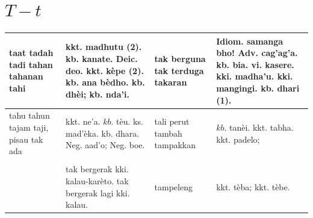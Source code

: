 \documentclass[10pt]{article}
\begin{document}
\section*{\(T-t\)}
\begin{center}
\begin{tabular}{|l|l|l|l|}
\hline
taat tadah tadi tahan tahanan tahi & kkt. madhutu (2). kb. kanate. Deic. deo. kkt. kèpe (2). kb. ana bèdho. kb. dhèi; kb. nda'i. & tak berguna tak terduga takaran & Idiom. samanga bho! Adv. cag'ag'a. kb. bia. vi. kasere. kki. madha'u. kki. mangingi. kb. dhari (1). \\
\hline
tahu tahun tajam taji, pisau tak ada & kkt. ne'a. \(k b\). tèu. ks. mad'èka. kb. dhara. Neg. aad'o; Neg. boe. & tali perut tambah tampakkan & \(k b\). tanèi. kkt. tabha. kkt. padelo; \\
\hline
 &  &  &  \\
\hline
 & tak bergerak kki. kalau-karèto. tak bergerak lagi kki. kalau. & tampeleng & kkt. tèba; kkt. tèbe. \\
\hline
\end{tabular}
\end{center}
\end{document}
